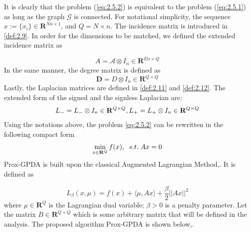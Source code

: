 It is clearly that the problem (\ref{eq:2.5.2}) is equivalent to the problem (\ref{eq:2.5.1}) as long as the graph $\mathcal{G}$ is connected. For notational simplicity, the sequence $x:=\{x_i\} \in \mathbf{R}^{Nn \times 1}$, and $Q = N \times n$. The incidence matrix is introduced in \ref{def:2.9}. In order for the dimensions to be matched, we defined the extended incidence matrix as

\begin{equation}\label{eq:2.5.3}
    A = \mathcal{A} \otimes I_n \in \mathbf{R}^{En \times Q}
\end{equation}
In the same manner, the degree matrix is defined as
\begin{equation}\label{eq:2.5.4}
    \mathbf{D} = D \otimes I_n \in \mathbf{R}^{Q \times Q}
\end{equation}
Lastly, the Laplacian matrices are defined in \ref{def:2.11} and \ref{def:2.12}. The extended form of the signed and the signless Laplacian are:
\begin{equation}\label{eq:2.5.5}
    L_{-} = L_{-} \otimes I_n \in \mathbf{R}^{Q \times Q}, \hspace{2.0mm}\\
    L_{+} = L_{+} \otimes I_n \in \mathbf{R}^{Q \times Q}
\end{equation}
Using the notations above, the problem \ref{eq:2.5.2} can be rewritten in the following compact form
\begin{equation}\label{eq:2.5.6}
    \min_{x \in \mathbf{R}^Q} f(x), \hspace{2.0mm} s.t. \hspace{1.0mm}Ax = 0
\end{equation}
\newpage
Prox-GPDA is built upon the classical Augmented Lagrangian Method,\cite{bertsekas2015incremental}. It is defined as

\begin{equation}\label{eq:2.5.7}
    L_{\beta}(x,\mu) = f(x) + \langle \mu, Ax\rangle + \frac{\beta}{2} ||Ax||^2
\end{equation}
where $\mu \in \mathbf{R}^Q$ is the Lagrangian dual variable; $\beta > 0$ is a penalty parameter. Let the matrix $B \in \mathbf{R}^{Q\times Q}$ which is some arbitrary matrix that will be defined in the analysis. The proposed algorithm Prox-GPDA is shown below,\cite{hong2016decomposing}.

